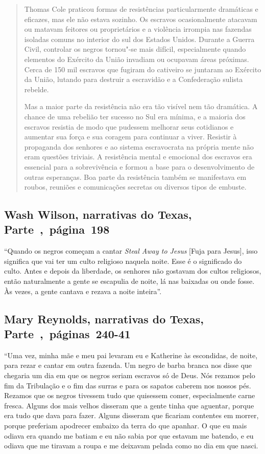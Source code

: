 \begin{quote}
Thomas Cole praticou formas de resistências particularmente
dramáticas e eficazes, mas ele não estava sozinho. Os escravos
ocasionalmente atacavam ou matavam feitores ou proprietários e a
violência irrompia nas fazendas isoladas comuns no interior do sul dos
Estados Unidos. Durante a Guerra Civil, controlar os negros tornou"-se
mais difícil, especialmente quando elementos do Exército da União
invadiam ou ocupavam áreas próximas. Cerca de 150 mil escravos que
fugiram do cativeiro se juntaram ao Exército da União, lutando para
destruir a escravidão e a Confederação sulista rebelde.

Mas a maior parte da resistência não era tão visível nem tão
dramática. A chance de uma rebelião ter sucesso no Sul era mínima, e a
maioria dos escravos resistia de modo que pudessem melhorar seus
cotidianos e aumentar sua força e sua coragem para continuar a viver.
Resistir à propaganda dos senhores e ao sistema escravocrata na própria
mente não eram questões triviais. A resistência mental e emocional dos
escravos era essencial para a sobrevivência e formou a base para o
desenvolvimento de outras esperanças. Boa parte da resistência também se
manifestava em roubos, reuniões e comunicações secretas ou diversos
tipos de embuste.
\end{quote}

\subsection{Wash Wilson, narrativas do Texas, Parte~,~página~198}
\label{ref302}

``Quando os negros começam a cantar \emph{Steal Away to Jesus} {[}Fuja para
Jesus{]}, isso significa que vai ter um culto religioso naquela noite.
Esse é o significado do culto. Antes e depois da liberdade, os senhores
não gostavam dos cultos religiosos, então naturalmente a gente se
escapulia de noite, lá nas baixadas ou onde fosse. Às vezes, a gente
cantava e rezava a noite inteira''.

\subsection{Mary Reynolds, narrativas do Texas, Parte~,~páginas~240-41}
\label{ref223}

``Uma vez, minha mãe e meu pai levaram eu e Katherine às escondidas, de
noite, para rezar e cantar em outra fazenda. Um negro de barba branca
nos disse que chegaria um dia em que os negros seriam escravos só de
Deus. Nós rezamos pelo fim da Tribulação e o fim das surras e para os
sapatos caberem nos nossos pés. Rezamos que os negros tivessem tudo que
quisessem comer, especialmente carne fresca. Alguns dos mais velhos
disseram que a gente tinha que aguentar, porque era tudo que dava para
fazer. Alguns disseram que ficariam contentes em morrer, porque
preferiam apodrecer embaixo da terra do que apanhar. O que eu mais
odiava era quando me batiam e eu não sabia por que estavam me batendo, e
eu odiava que me tiravam a roupa e me deixavam pelada como no dia em que
nasci.


